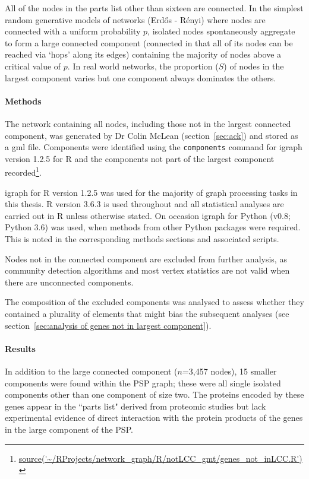 All of the nodes in the parts list other than sixteen are connected. In the simplest random generative models of networks (Erd{\H{o}}s - R{\'e}nyi\cite{erdHos1960evolution}) where nodes are connected with a uniform probability $p$, isolated nodes spontaneously aggregate to form a large connected component (connected in that all of its nodes can be reached via `hops' along its edges) containing the majority of nodes above a critical value of $p$\cite{newman2018networks}. In real world networks, the proportion ($S$) of nodes in the largest component varies but one component always dominates the others\cite{newman2018networks}.


\paragraph{Methods}
The network containing all nodes, including those not in the largest connected component, was generated by Dr Colin McLean (section~\ref{sec:ack}) and stored as a gml file. Components were identified using the \texttt{components} command for igraph version 1.2.5\cite{csardi2006igraph} for R and the components not part of the largest component recorded\footnote{\url{source('~/RProjects/network_graph/R/notLCC_gmt/genes_not_inLCC.R')}}. 

 igraph for R version 1.2.5 was used for the majority of graph processing tasks in this thesis\cite{csardi2006igraph}. R version 3.6.3\cite{ihaka1996r} is used throughout and  all statistical analyses are carried out in R unless otherwise stated. On occasion igraph for Python (v0.8; Python 3.6) was used, when methods from other Python packages were required. This is noted in the corresponding methods sections and associated scripts.

Nodes not in the connected component are excluded from further analysis, as community detection algorithms and most vertex statistics are not valid when there are unconnected components.

The composition of the excluded components was analysed to assess whether they contained a plurality of elements that might bias the subsequent analyses (see section~\ref{sec:analysis of genes not in largest component}). 

\paragraph{Results}
In addition to the large connected component ($n$=3,457 nodes), 15 smaller components were found within the PSP graph; these were all single isolated components other than one component of size two.  The  proteins encoded by these genes appear in the ``parts list" derived from proteomic studies but lack experimental evidence of direct interaction with the protein products of the genes in the large component of the PSP.


